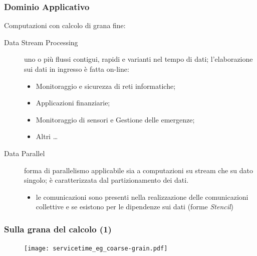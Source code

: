 \documentclass{beamer}
\begin{document}
\begin{frame}
  \frametitle{Dominio Applicativo}
   Computazioni con calcolo di grana fine:
    \begin{description}
    \item [Data Stream Processing] uno o pi\`u flussi contigui, rapidi e varianti nel tempo di dati; l'elaborazione sui dati in ingresso \`e fatta on-line:\hfill
      \begin{itemize}
      \item Monitoraggio e sicurezza di reti informatiche;
      \item Applicazioni finanziarie;
      \item Monitoraggio di sensori e Gestione delle emergenze;
      \item Altri \ldots
      \end{itemize}
    \item [Data Parallel] forma di parallelismo applicabile sia a computazioni su stream che su dato singolo; \`e caratterizzata dal partizionamento dei dati.
      \begin{itemize}
      \item le comunicazioni sono presenti nella realizzazione delle comunicazioni collettive e se esistono per le dipendenze sui dati (forme \emph{Stencil})
      \end{itemize}
    \end{description}
\end{frame}


\begin{frame}
  \frametitle{Sulla grana del calcolo (1)}
  \begin{figure}
    \texttt{[image: servicetime\_eg\_coarse-grain.pdf]}
  \end{figure}
\end{frame}
\end{document}
